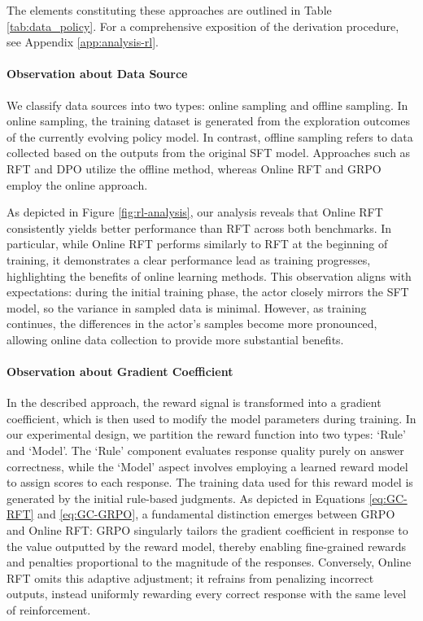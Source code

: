 The elements constituting these approaches are outlined in Table \ref{tab:data_policy}. For a comprehensive exposition of the derivation procedure, see Appendix \ref{app:analysis-rl}.

\paragraph{Observation about Data Source} We classify data sources into two types: online sampling and offline sampling. In online sampling, the training dataset is generated from the exploration outcomes of the currently evolving policy model. In contrast, offline sampling refers to data collected based on the outputs from the original SFT model. Approaches such as RFT and DPO utilize the offline method, whereas Online RFT and GRPO employ the online approach.

As depicted in Figure \ref{fig:rl-analysis}, our analysis reveals that Online RFT consistently yields better performance than RFT across both benchmarks. In particular, while Online RFT performs similarly to RFT at the beginning of training, it demonstrates a clear performance lead as training progresses, highlighting the benefits of online learning methods. This observation aligns with expectations: during the initial training phase, the actor closely mirrors the SFT model, so the variance in sampled data is minimal. However, as training continues, the differences in the actor's samples become more pronounced, allowing online data collection to provide more substantial benefits.

\paragraph{Observation about Gradient Coefficient} In the described approach, the reward signal is transformed into a gradient coefficient, which is then used to modify the model parameters during training. In our experimental design, we partition the reward function into two types: `Rule' and `Model'. The `Rule' component evaluates response quality purely on answer correctness, while the `Model' aspect involves employing a learned reward model to assign scores to each response. The training data used for this reward model is generated by the initial rule-based judgments. As depicted in Equations \ref{eq:GC-RFT} and \ref{eq:GC-GRPO}, a fundamental distinction emerges between GRPO and Online RFT: GRPO singularly tailors the gradient coefficient in response to the value outputted by the reward model, thereby enabling fine-grained rewards and penalties proportional to the magnitude of the responses. Conversely, Online RFT omits this adaptive adjustment; it refrains from penalizing incorrect outputs, instead uniformly rewarding every correct response with the same level of reinforcement.

